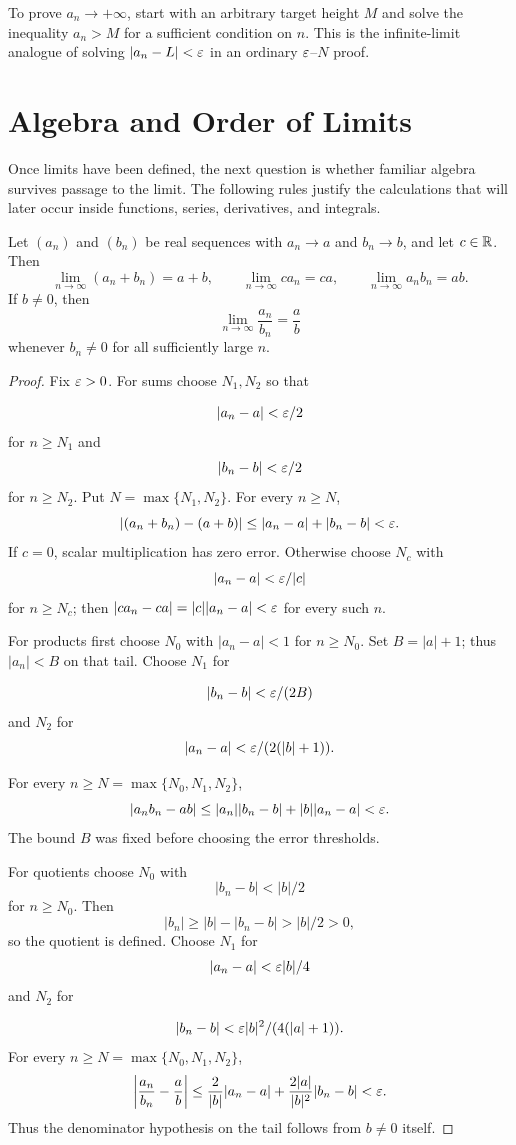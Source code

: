 \begin{remark}
To prove $a_n\to+\infty$, start with an arbitrary target height $M$ and
solve the inequality $a_n>M$ for a sufficient condition on $n$.  This is
the infinite-limit analogue of solving $\lvert a_n-L\rvert<\varepsilon$ in an ordinary
$\varepsilon$--$N$ proof.
\end{remark}

\section{Algebra and Order of Limits}

Once limits have been defined, the next question is whether familiar algebra
survives passage to the limit.  The following rules justify the calculations
that will later occur inside functions, series, derivatives, and integrals.

\begin{theorem}
\label{thm:limit-algebra}
Let $(a_n)$ and $(b_n)$ be real sequences with $a_n\to a$ and $b_n\to b$, and let $c\in\mathbb{R}$. Then
\[
\lim_{n\to\infty}(a_n+b_n)=a+b,
\qquad
\lim_{n\to\infty}ca_n=ca,
\qquad
\lim_{n\to\infty}a_nb_n=ab.
\]
If $b\ne0$, then
\[
\lim_{n\to\infty}\frac{a_n}{b_n}=\frac ab
\]
whenever $b_n\ne0$ for all sufficiently large $n$.
\end{theorem}
\begin{proof}
Fix $\varepsilon>0$. For sums choose $N_1,N_2$ so that

\[
|a_n-a|<\varepsilon/2
\]
 for $n\geq N_1$ and
\[
|b_n-b|<\varepsilon/2
\]
 for
$n\geq N_2$. Put $N=\max\{N_1,N_2\}$. For every $n\geq N$,
\[
|(a_n+b_n)-(a+b)|\leq|a_n-a|+|b_n-b|<\varepsilon.
\]
If $c=0$, scalar multiplication has zero error. Otherwise choose $N_c$
with
\[
|a_n-a|<\varepsilon/|c|
\]
 for $n\geq N_c$; then
$|ca_n-ca|=|c||a_n-a|<\varepsilon$ for every such $n$.

For products first choose $N_0$ with $|a_n-a|<1$ for $n\geq N_0$.
Set $B=|a|+1$; thus $|a_n|<B$ on that tail. Choose $N_1$ for

\[
|b_n-b|<\varepsilon/(2B)
\]
 and $N_2$ for
\[
|a_n-a|<\varepsilon/(2(|b|+1)).
\]

For every $n\geq N=\max\{N_0,N_1,N_2\}$,
\[
|a_nb_n-ab|\leq |a_n||b_n-b|+|b||a_n-a|<\varepsilon.
\]
The bound $B$ was fixed before choosing the error thresholds.

For quotients choose $N_0$ with
\[
|b_n-b|<|b|/2
\]
 for $n\geq N_0$.
Then
\[
|b_n|\geq|b|-|b_n-b|>|b|/2>0,
\]
 so the quotient is defined.
Choose $N_1$ for
\[
|a_n-a|<\varepsilon|b|/4
\]
 and $N_2$ for

\[
|b_n-b|<\varepsilon|b|^2/(4(|a|+1)).
\]
 For every
$n\geq N=\max\{N_0,N_1,N_2\}$,
\[
\left|\frac{a_n}{b_n}-\frac ab\right|
\leq\frac2{|b|}|a_n-a|+\frac{2|a|}{|b|^2}|b_n-b|<\varepsilon.
\]
Thus the denominator hypothesis on the tail follows from $b\ne0$ itself.
\end{proof}

